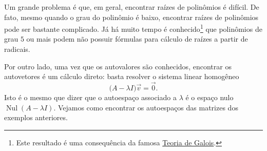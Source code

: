 Um grande problema é que, em geral, encontrar raízes de polinômios é difícil. De fato, mesmo quando o grau do polinômio é baixo, encontrar raízes de polinômios pode ser bastante complicado. Já há muito tempo é conhecido\footnote{Este resultado é uma consequência da famosa \href{https://pt.wikipedia.org/wiki/Teoria_de_Galois}{Teoria de Galois}.} que polinômios de grau $5$ ou mais podem não possuir fórmulas para cálculo de raízes a partir de radicais.

Por outro lado, uma vez que os autovalores são conhecidos, encontrar os autovetores é um cálculo direto: basta resolver o sistema linear homogêneo
\begin{equation}
\big( A - \lambda I \big) \vec{v} = \vec{0}.
\end{equation} Isto é o mesmo que dizer que o autoespaço associado a $\lambda$ é o espaço nulo $\operatorname{Nul} (A - \lambda I)$. Vejamos como encontrar os autoespaços das matrizes dos exemplos anteriores.

